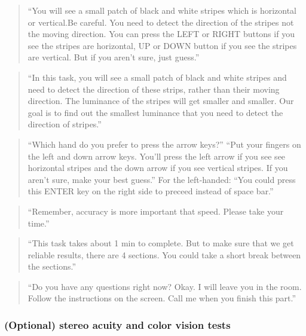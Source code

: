 \documentclass[]{article}
\begin{document}
\begin{quote}
``You will see a small patch of black and white stripes which is
horizontal or vertical.Be careful. You need to detect the direction of
the stripes not the moving direction. You can press the LEFT or RIGHT
buttons if you see the stripes are horizontal, UP or DOWN button if you
see the stripes are vertical. But if you aren't sure, just guess.''
\end{quote}

\begin{quote}
``In this task, you will see a small patch of black and white stripes
and need to detect the direction of these strips, rather than their
moving direction. The luminance of the stripes will get smaller and
smaller. Our goal is to find out the smallest luminance that you need to
detect the direction of stripes.''
\end{quote}

\begin{quote}
``Which hand do you prefer to press the arrow keys?'' ``Put your fingers
on the left and down arrow keys. You'll press the left arrow if you see
see horizontal stripes and the down arrow if you see vertical stripes.
If you aren't sure, make your best guess.'' For the left-handed: ``You
could press this ENTER key on the right side to preceed instead of space
bar.''
\end{quote}

\begin{quote}
``Remember, accuracy is more important that speed. Please take your
time.''
\end{quote}

\begin{quote}
``This task takes about 1 min to complete. But to make sure that we get
reliable results, there are 4 sections. You could take a short break
between the sections.''
\end{quote}

\begin{quote}
``Do you have any questions right now? Okay. I will leave you in the
room. Follow the instructions on the screen. Call me when you finish
this part.''
\end{quote}

\subsubsection{(Optional) stereo acuity and color vision
tests}\label{optional-stereo-acuity-and-color-vision-tests}
\end{document}
